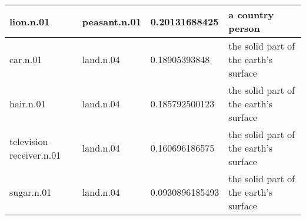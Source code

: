 \begin{center}
\begin{tabular}{ | l | l | l | l |}
lion.n.01 & peasant.n.01 & 0.20131688425 & a country person\\ \hline
car.n.01 & land.n.04 & 0.18905393848 & the solid part of the earth's surface\\ \hline
hair.n.01 & land.n.04 & 0.185792500123 & the solid part of the earth's surface\\ \hline
television receiver.n.01 & land.n.04 & 0.160696186575 & the solid part of the earth's surface\\ \hline
sugar.n.01 & land.n.04 & 0.0930896185493 & the solid part of the earth's surface\\ \hline
\end{tabular}
\end{center}